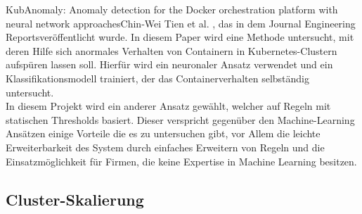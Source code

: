 \documentclass[a4paper,10pt]{scrartcl}
\begin{document}
\glqq KubAnomaly: Anomaly detection for the Docker orchestration platform with neural network approaches\grqq Chin‐Wei Tien et al. \cite{Tien.2019}, das in dem Journal \glqq Engineering Reports\grqq veröffentlicht wurde. In diesem Paper wird eine Methode untersucht, mit deren Hilfe sich anormales Verhalten von Containern in Kubernetes-Clustern aufspüren lassen soll. Hierfür wird ein neuronaler Ansatz verwendet und ein Klassifikationsmodell trainiert, der das Containerverhalten selbständig untersucht.\\
In diesem Projekt wird ein anderer Ansatz gewählt, welcher auf Regeln mit statischen Thresholds basiert. Dieser verspricht gegenüber den Machine-Learning Ansätzen einige Vorteile die es zu untersuchen gibt, vor Allem die leichte Erweiterbarkeit des System durch einfaches Erweitern von Regeln und die Einsatzmöglichkeit für Firmen, die keine Expertise in Machine Learning besitzen.

\subsection{Cluster-Skalierung}
\end{document}
